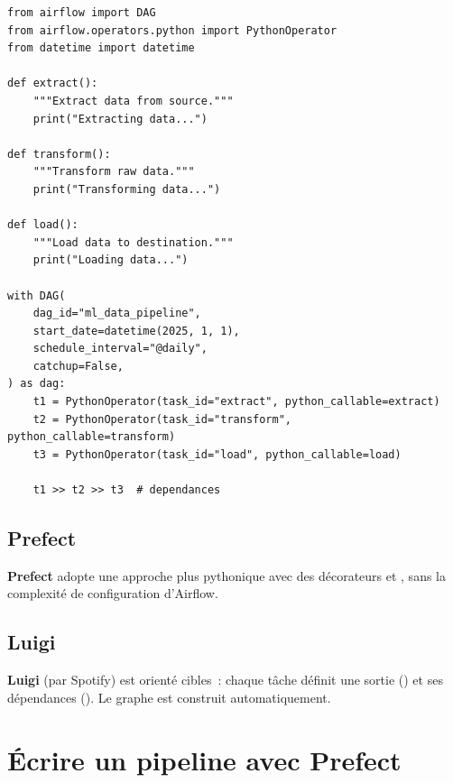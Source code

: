 \begin{codeblock}[title=\textbf{Exemple de DAG Airflow}]
\begin{verbatim}
from airflow import DAG
from airflow.operators.python import PythonOperator
from datetime import datetime

def extract():
    """Extract data from source."""
    print("Extracting data...")

def transform():
    """Transform raw data."""
    print("Transforming data...")

def load():
    """Load data to destination."""
    print("Loading data...")

with DAG(
    dag_id="ml_data_pipeline",
    start_date=datetime(2025, 1, 1),
    schedule_interval="@daily",
    catchup=False,
) as dag:
    t1 = PythonOperator(task_id="extract", python_callable=extract)
    t2 = PythonOperator(task_id="transform", python_callable=transform)
    t3 = PythonOperator(task_id="load", python_callable=load)

    t1 >> t2 >> t3  # dependances
\end{verbatim}
\end{codeblock}

\subsection{Prefect}

\textbf{Prefect} adopte une approche plus pythonique avec des d\'ecorateurs
 et , sans la complexit\'e de configuration d'Airflow.

\subsection{Luigi}

\textbf{Luigi} (par Spotify) est orient\'e cibles~: chaque t\^ache d\'efinit
une sortie () et ses d\'ependances (). Le
graphe est construit automatiquement.

\section{\'Ecrire un pipeline avec Prefect}
\label{sec:prefect-pipeline}


